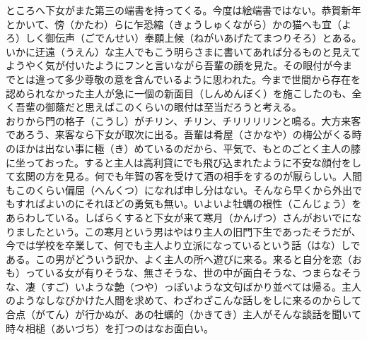 \documentclass{book}
\begin{document}
ところへ下女がまた第三の端書を持ってくる。今度は絵端書ではない。恭賀新年とかいて、傍（かたわ）らに乍恐縮（きょうしゅくながら）かの猫へも宜（よろ）しく御伝声（ごでんせい）奉願上候（ねがいあげたてまつりそろ）とある。いかに迂遠（うえん）な主人でもこう明らさまに書いてあれば分るものと見えてようやく気が付いたようにフンと言いながら吾輩の顔を見た。その眼付が今までとは違って多少尊敬の意を含んでいるように思われた。今まで世間から存在を認められなかった主人が急に一個の新面目（しんめんぼく）を施こしたのも、全く吾輩の御蔭だと思えばこのくらいの眼付は至当だろうと考える。\\
おりから門の格子（こうし）がチリン、チリン、チリリリリンと鳴る。大方来客であろう、来客なら下女が取次に出る。吾輩は肴屋（さかなや）の梅公がくる時のほかは出ない事に極（き）めているのだから、平気で、もとのごとく主人の膝に坐っておった。すると主人は高利貸にでも飛び込まれたように不安な顔付をして玄関の方を見る。何でも年賀の客を受けて酒の相手をするのが厭らしい。人間もこのくらい偏屈（へんくつ）になれば申し分はない。そんなら早くから外出でもすればよいのにそれほどの勇気も無い。いよいよ牡蠣の根性（こんじょう）をあらわしている。しばらくすると下女が来て寒月（かんげつ）さんがおいでになりましたという。この寒月という男はやはり主人の旧門下生であったそうだが、今では学校を卒業して、何でも主人より立派になっているという話（はな）しである。この男がどういう訳か、よく主人の所へ遊びに来る。来ると自分を恋（おも）っている女が有りそうな、無さそうな、世の中が面白そうな、つまらなそうな、凄（すご）いような艶（つや）っぽいような文句ばかり並べては帰る。主人のようなしなびかけた人間を求めて、わざわざこんな話しをしに来るのからして合点（がてん）が行かぬが、あの牡蠣的（かきてき）主人がそんな談話を聞いて時々相槌（あいづち）を打つのはなお面白い。\\
\end{document}
